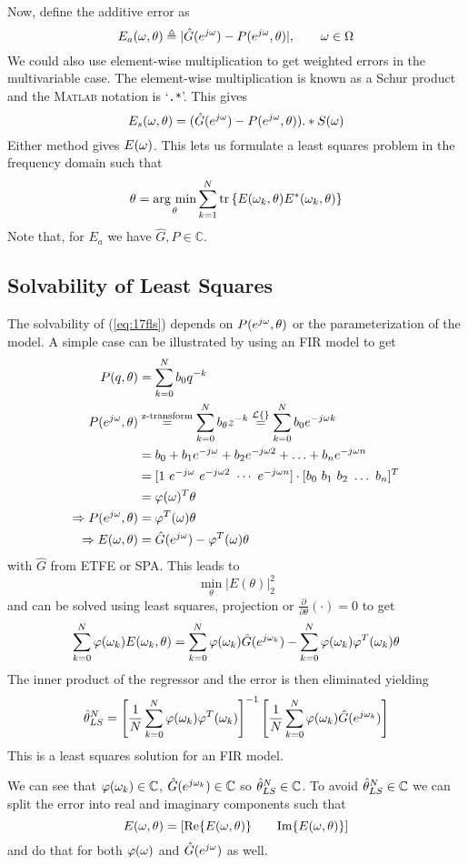 Now, define the additive error as
$$E_a(\omega,\theta) \triangleq |\hat{G}(e^{j\omega})-P(e^{j\omega},\theta)|, \qquad \omega\in\Omega$$
We could also use element-wise multiplication to get weighted errors in the multivariable case. The element-wise multiplication is known as a Schur product and the \textsc{Matlab} notation is `\texttt{.*}'. This gives
$$E_s(\omega,\theta) = (\hat{G}(e^{j\omega})-P(e^{j\omega},\theta)).*S(\omega)$$
Either method gives $E(\omega)$. This lets us formulate a least squares problem in the frequency domain such that
\begin{align}
\label{eq:17fls}
\theta = \mathop{\arg\,\min}\limits_\theta\sum_{k=1}^N\text{tr}\left\lbrace E(\omega_k,\theta)E^\ast(\omega_k,\theta)\right\rbrace
\end{align}
Note that, for $E_a$ we have $\hat{G},P\in\mathbb{C}$.

\subsection{Solvability of Least Squares}
The solvability of (\ref{eq:17fls}) depends on $P(e^{j\omega},\theta)$ or the parameterization of the model. A simple case can be illustrated by using an FIR model to get
\begin{align*}
P(q,\theta) &= \sum_{k=0}^N b_0q^{-k} \\
P(e^{j\omega},\theta) &\stackrel{\text{z-transform}}{=} \sum_{k=0}^N b_\theta z^{-k} \stackrel{\mathcal{L}\{\}}{=} \sum_{k=0}^N b_0e^{-j\omega k} \\
&= b_0 + b_1e^{-j\omega} + b_2e^{-j\omega 2} + \ldots + b_ne^{-j\omega n} \\
&= [1 ~ e^{-j\omega} ~ e^{-j\omega 2} ~ \cdots ~ e^{-j\omega n}] \cdot [b_0 ~ b_1 ~ b_2 ~ \ldots ~ b_n]^T \\
&= \varphi(\omega)^T\theta \\
\Rightarrow P(e^{j\omega},\theta) &= \varphi^T(\omega)\theta \\
\Rightarrow E(\omega,\theta) &= \hat{G}(e^{j\omega})-\varphi^T(\omega)\theta
\end{align*}
with $\hat{G}$ from ETFE or SPA. This leads to
$$\min_\theta|E(\theta)|_2^2$$
and can be solved using least squares, projection or $\tfrac{\partial}{\partial\theta}(\cdot)=0$ to get
$$\sum_{k=0}^N\varphi(\omega_k)E(\omega_k,\theta) = \sum_{k=0}^N\varphi(\omega_k)\hat{G}(e^{j\omega_k}) - \sum_{k=0}^N\varphi(\omega_k)\varphi^T(\omega_k)\theta$$
The inner product of the regressor and the error is then eliminated yielding
$$\hat{\theta}_{LS}^N = \left[\frac{1}{N}\sum_{k=0}^N\varphi(\omega_k)\varphi^T(\omega_k)\right]^{-1}\left[\frac{1}{N}\sum_{k=0}^N\varphi(\omega_k)\hat{G}(e^{j\omega_k})\right]$$
This is a least squares solution for an FIR model.

We can see that $\varphi(\omega_k)\in\mathbb{C}$, $\hat{G}(e^{j\omega_k})\in\mathbb{C}$ so $\hat{\theta}_{LS}^N\in\mathbb{C}$. To avoid $\hat{\theta}_{LS}^N\in\mathbb{C}$ we can split the error into real and imaginary components such that
$$E(\omega,\theta) = \left[\text{Re}\{E(\omega,\theta)\} \qquad \text{Im}\{E(\omega,\theta)\}\right]$$
and do that for both $\varphi(\omega)$ and $\hat{G}(e^{j\omega})$ as well.

